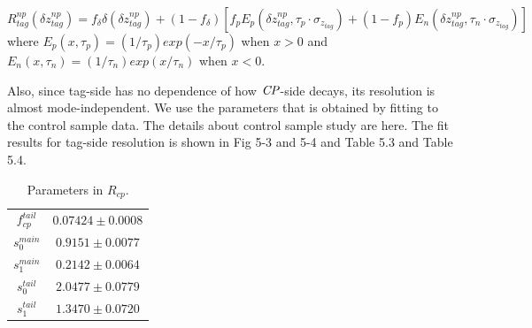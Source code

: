 \begin{equation}
R_{tag}^{np}(\delta z_{tag}^{np})=f_{\delta}\delta(\delta z_{tag}^{np}) + 
(1-f_{\delta})[f_p E_p(\delta z_{tag}^{np},\tau_p\cdot \sigma_{z_{tag}}) +
(1-f_p)E_n(\delta z_{tag}^{np},\tau_n\cdot \sigma_{z_{tag}}) ]
\end{equation} where $E_p(x,\tau_p)=(1/\tau_p)exp(-x/\tau_p) $ when $x > 0$ and $E_n(x,\tau_n)=(1/\tau_n)exp(x/\tau_n) $ when $x < 0$.

Also, since tag-side has no dependence of how $\it{CP}$-side decays, its resolution is almost mode-independent. We use the parameters that is obtained by fitting to the control sample data. The details about control sample study are here\cite{jpsiks_ichep}. The fit results for tag-side resolution is shown in Fig 5-3 and 5-4 and Table 5.3 and Table 5.4.

\begin{table}[H]
	\begin{minipage}[b]{1.0\linewidth}
		\centering
		\caption{Parameters in $R_{cp}$.}
		\begin{tabular}{|c|c|}
			\hline
			$f_{cp}^{tail}$ & $0.07424 \pm 0.0008$\\
			$s_0^{main}$&  $0.9151 \pm 0.0077$ \\
			$s_1^{main}$ & $0.2142\pm 0.0064$\\
			$s_0^{tail}$ &  $2.0477\pm 0.0779$\\
			$s_1^{tail}$  & $1.3470\pm 0.0720$ \\
			\hline
		\end{tabular}
	\end{minipage}
\end{table}

